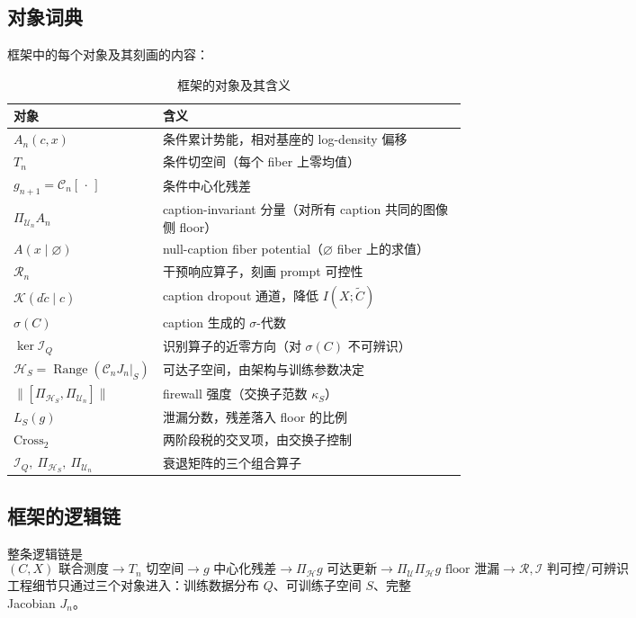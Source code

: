 \documentclass[11pt,a4paper]{article}
\newcommand{\cH}{\mathcal{H}}
\newcommand{\cR}{\mathcal{R}}
\newcommand{\cI}{\mathcal{I}}
\newcommand{\cU}{\mathcal{U}}
\newcommand{\cK}{\mathcal{K}}
\newcommand{\ProjectOp}{\Pi}
\newcommand{\nul}{\varnothing}
\newcommand{\Range}{\operatorname{Range}}
\newcommand{\Center}{\mathcal{C}}
\begin{document}
\subsection{对象词典}

框架中的每个对象及其刻画的内容：

\begin{table}[htbp]
\centering
\caption{框架的对象及其含义}
\label{tab:dictionary}
\small
\begin{tabular}{@{}p{5cm}p{8.6cm}@{}}
\toprule
\textbf{对象} & \textbf{含义} \\
\midrule
$A_n(c,x)$ & 条件累计势能，相对基座的 log-density 偏移 \\
$T_n$ & 条件切空间（每个 fiber 上零均值） \\
$g_{n+1}=\Center_n[\,\cdot\,]$ & 条件中心化残差 \\
$\ProjectOp_{\cU_n}A_n$ & caption-invariant 分量（对所有 caption 共同的图像侧 floor） \\
$A(x\mid\nul)$ & null-caption fiber potential（$\nul$ fiber 上的求值） \\
$\cR_n$ & 干预响应算子，刻画 prompt 可控性 \\
$\cK(d\tilde c\mid c)$ & caption dropout 通道，降低 $I(X;\tilde C)$ \\
$\sigma(C)$ & caption 生成的 $\sigma$-代数 \\
$\ker\cI_Q$ & 识别算子的近零方向（对 $\sigma(C)$ 不可辨识） \\
$\cH_S=\Range(\Center_n J_n|_S)$ & 可达子空间，由架构与训练参数决定 \\
$\|[\ProjectOp_{\cH_S},\ProjectOp_{\cU_n}]\|$ & firewall 强度（交换子范数 $\kappa_S$） \\
$L_S(g)$ & 泄漏分数，残差落入 floor 的比例 \\
$\mathrm{Cross}_2$ & 两阶段税的交叉项，由交换子控制 \\
$\cI_Q,\ \ProjectOp_{\cH_S},\ \ProjectOp_{\cU_n}$ & 衰退矩阵的三个组合算子 \\
\bottomrule
\end{tabular}
\end{table}

\subsection{框架的逻辑链}

整条逻辑链是
\[
\boxed{
(C,X)\text{ 联合测度} \to T_n\text{ 切空间} \to g\text{ 中心化残差} \to \ProjectOp_{\cH}g\text{ 可达更新} \to \ProjectOp_{\cU}\ProjectOp_{\cH}g\text{ floor 泄漏} \to \cR,\cI\text{ 判可控/可辨识}
}
\]
工程细节只通过三个对象进入：训练数据分布 $Q$、可训练子空间 $S$、完整 Jacobian $J_n$。
\end{document}
